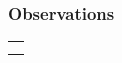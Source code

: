 % 
% 
%

 \subsubsection*{Observations}
  \begin{tabularx}{\linewidth}{X}
    \hline
    \\
    \hline
    \\
    \hline
    \\
    \hline
    \end{tabularx}
